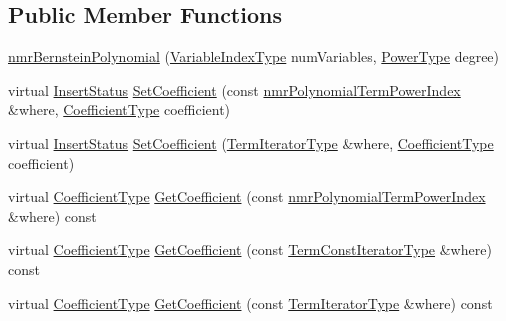 \subsection*{Public Member Functions}
\begin{DoxyCompactItemize}
\item 
\hyperlink{classnmr_bernstein_polynomial_a7ef25e6984df6f2c6b4dbfc1ea2273cc}{nmr\+Bernstein\+Polynomial} (\hyperlink{classnmr_polynomial_base_aae95477e451ddc7d3ee3f41cbdaadde2}{Variable\+Index\+Type} num\+Variables, \hyperlink{classnmr_polynomial_base_a58607c884bf2e6725a77ed4d9e14ba26}{Power\+Type} degree)
\item 
virtual \hyperlink{classnmr_polynomial_base_ac3b6b28653104ea70419279a35580940}{Insert\+Status} \hyperlink{classnmr_bernstein_polynomial_ada942e63869c140436d7b9706b2b5199}{Set\+Coefficient} (const \hyperlink{classnmr_polynomial_term_power_index}{nmr\+Polynomial\+Term\+Power\+Index} \&where, \hyperlink{classnmr_polynomial_base_a8693efdfc8585ccb49abea69f74f3eef}{Coefficient\+Type} coefficient)
\item 
virtual \hyperlink{classnmr_polynomial_base_ac3b6b28653104ea70419279a35580940}{Insert\+Status} \hyperlink{classnmr_bernstein_polynomial_a39bb0e94db9696628401d9e6f5e74b1e}{Set\+Coefficient} (\hyperlink{classnmr_polynomial_container_a276e57445d038e8a16462f47b85719a3}{Term\+Iterator\+Type} \&where, \hyperlink{classnmr_polynomial_base_a8693efdfc8585ccb49abea69f74f3eef}{Coefficient\+Type} coefficient)
\item 
virtual \hyperlink{classnmr_polynomial_base_a8693efdfc8585ccb49abea69f74f3eef}{Coefficient\+Type} \hyperlink{classnmr_bernstein_polynomial_a658ac3ee28fcc0ee072a83c79eaf2489}{Get\+Coefficient} (const \hyperlink{classnmr_polynomial_term_power_index}{nmr\+Polynomial\+Term\+Power\+Index} \&where) const 
\item 
virtual \hyperlink{classnmr_polynomial_base_a8693efdfc8585ccb49abea69f74f3eef}{Coefficient\+Type} \hyperlink{classnmr_bernstein_polynomial_aff3c634b10989a7ac81272eb06e5f5a8}{Get\+Coefficient} (const \hyperlink{classnmr_polynomial_container_aba8d31506ab6a487fdc4fe2815469442}{Term\+Const\+Iterator\+Type} \&where) const 
\item 
virtual \hyperlink{classnmr_polynomial_base_a8693efdfc8585ccb49abea69f74f3eef}{Coefficient\+Type} \hyperlink{classnmr_bernstein_polynomial_a989595e97345a8dbfab7c77c637dc9fb}{Get\+Coefficient} (const \hyperlink{classnmr_polynomial_container_a276e57445d038e8a16462f47b85719a3}{Term\+Iterator\+Type} \&where) const 
\item 

\end{DoxyCompactItemize}
